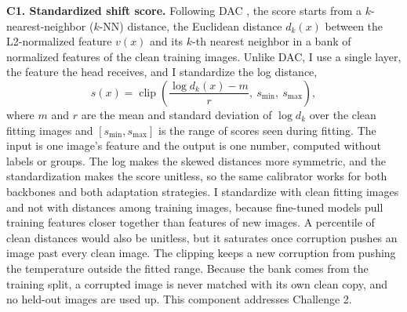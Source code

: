 \documentclass[sigconf,nonacm]{acmart}
\begin{document}
\textbf{C1. Standardized shift score.} Following DAC \cite{tomani2023dac}, the score starts from a $k$-nearest-neighbor ($k$-NN) distance, the Euclidean distance $d_k(x)$ between the L2-normalized feature $v(x)$ and its $k$-th nearest neighbor in a bank of normalized features of the clean training images. Unlike DAC, I use a single layer, the feature the head receives, and I standardize the log distance,
\begin{equation}
  s(x) = \operatorname{clip}\left(\frac{\log d_k(x) - m}{r},\ s_{\min},\ s_{\max}\right),
  \label{eq:score}
\end{equation}
where $m$ and $r$ are the mean and standard deviation of $\log d_k$ over the clean fitting images and $[s_{\min}, s_{\max}]$ is the range of scores seen during fitting. The input is one image's feature and the output is one number, computed without labels or groups. The log makes the skewed distances more symmetric, and the standardization makes the score unitless, so the same calibrator works for both backbones and both adaptation strategies. I standardize with clean fitting images and not with distances among training images, because fine-tuned models pull training features closer together than features of new images. A percentile of clean distances would also be unitless, but it saturates once corruption pushes an image past every clean image. The clipping keeps a new corruption from pushing the temperature outside the fitted range. Because the bank comes from the training split, a corrupted image is never matched with its own clean copy, and no held-out images are used up. This component addresses Challenge 2.
\end{document}
